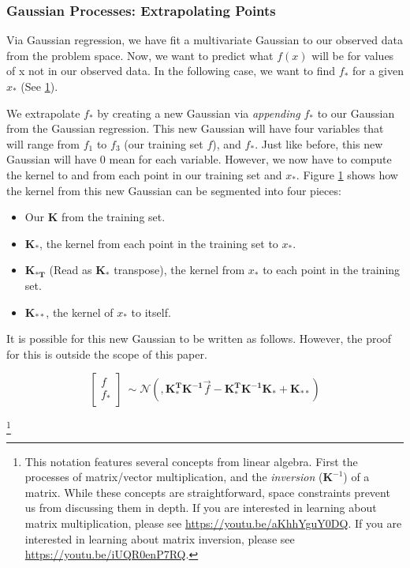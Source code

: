 \documentclass{sig-alternate}
\begin{document}
\subsubsection{Gaussian Processes: Extrapolating Points}

Via Gaussian regression, we have fit a multivariate Gaussian to our observed data from the problem space.
Now, we want to predict what $f(x)$ will be for values of x not in our observed data.
In the following case, we want to find $f_{*}$ for a given $x_{*}$ (See \ref{fig:GPEXT}).

\begin{figure}[htb]
\centering
{}
\caption{}
\label{fig:GPEXT}
\end{figure}

We extrapolate $f_{*}$ by creating a new Gaussian via \textit{appending} $f_{*}$ to our Gaussian from the Gaussian regression.
This new Gaussian will have four variables that will range from $f_{1}$ to $f_{3}$ (our training set $f$), and $f_{*}$.
Just like before, this new Gaussian will have 0 mean for each variable.
However, we now have to compute the kernel to and from each point in our training set and $x_{*}$.
Figure \ref{fig:GPEXT} shows how the kernel from this new Gaussian can be segmented into four pieces:

 \begin{itemize}
   \item Our $\mathbf{K}$ from the training set.
   \item $\mathbf{K_{*}}$, the kernel from each point in the training set to $x_{*}$.
   \item $\mathbf{K_{*T}}$ (Read as $\mathbf{K_{*}}$ transpose), the kernel from $x_{*}$ to each point in the training set.
   \item $\mathbf{K_{**}}$, the kernel of $x_{*}$ to itself.
 \end{itemize}
 
 It is possible for this new Gaussian to be written as follows.
 However, the proof for this is outside the scope of this paper.
 
\[\begin{bmatrix}
    f \\
    f_{*} \\
  \end{bmatrix} 
  ~ \sim \mathcal{N}(
    ,\mathbf{K_{*}^{T} K^{-1}} \Vec{f}
    -\mathbf{K_{*}^{T} K^{-1} K_{*}} + \mathbf{K_{**}} )\]
    
\footnote{This notation features several concepts from linear algebra.
First the processes of matrix/vector multiplication, and the \textit{inversion} ($\mathbf{K}^{-1}$) of a matrix.
While these concepts are straightforward, space constraints prevent us from discussing them in depth. If you are interested in learning about matrix multiplication, please see \url{https://youtu.be/aKhhYguY0DQ}.
If you are interested in learning about matrix inversion, please see \url{https://youtu.be/iUQR0enP7RQ}.}
\end{document}
